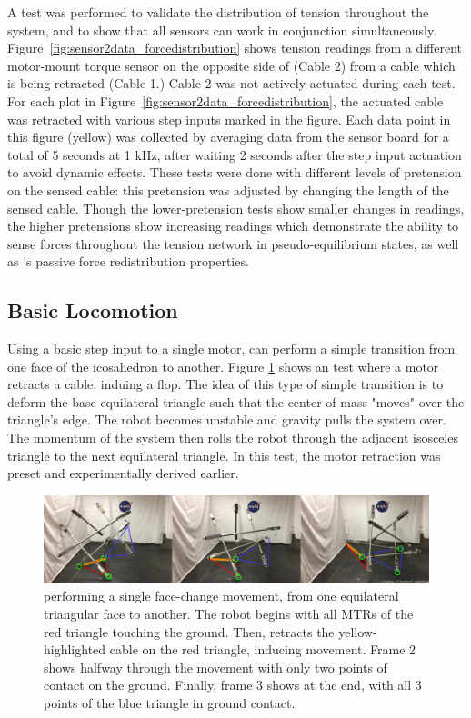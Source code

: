A test was performed to validate the distribution of tension throughout the system, and to show that all sensors can work in conjunction simultaneously.
Figure~\ref{fig:sensor2data_forcedistribution} shows tension readings from a different motor-mount torque sensor on the opposite side of \SB{} (Cable 2) from a cable which is being retracted (Cable 1.)
Cable 2 was not actively actuated during each test.
For each plot in Figure~\ref{fig:sensor2data_forcedistribution}, the actuated cable was retracted with various step inputs marked in the figure.
Each data point in this figure (yellow) was collected by averaging data from the sensor board for a total of 5 seconds at 1 kHz, after waiting 2 seconds after the step input actuation to avoid dynamic effects.
These tests were done with different levels of pretension on the sensed cable: this pretension was adjusted by changing the length of the sensed cable.
Though the lower-pretension tests show smaller changes in readings, the higher pretensions show increasing readings which demonstrate the ability to sense forces throughout the tension network in pseudo-equilibrium states, as well as \SB{}'s passive force redistribution properties.

\subsection{Basic Locomotion}
\label{basic_locomotion}
Using a basic step input to a single motor, \SB{} can perform a simple transition from one face of the icosahedron to another.
Figure \ref{fig:superball_flop_flat} shows an test where a motor retracts a cable, induing a flop.
The idea of this type of simple transition is to deform the base equilateral triangle such that the center of mass "moves" over the triangle's edge.
The robot becomes unstable and gravity pulls the system over.
The momentum of the system then rolls the robot through the adjacent isosceles triangle to the next equilateral triangle.
In this test, the motor retraction was preset and experimentally derived earlier.

\begin{figure}[t]
    \centering
    \includegraphics[width=1\linewidth]{tex/img/superball_flop_combined_betterlabels}
    \caption{\SB{} performing a single face-change movement, from one equilateral triangular face to another. The robot begins with all MTRs of the red triangle touching the ground. Then, \SB{} retracts the yellow-highlighted cable on the red triangle, inducing movement. Frame 2 shows \SB{} halfway through the movement with only two points of contact on the ground. Finally, frame 3 shows \SB{} at the end, with all 3 points of the blue triangle in ground contact.}
    \label{fig:superball_flop_flat}
\end{figure}

